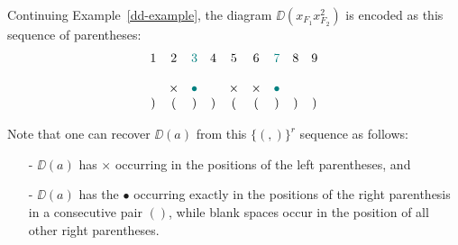 \begin{example} \label{dd-to-()-example}
  \rm  Continuing Example~\ref{dd-example}, the diagram $\DD(x_{F_1} x_{F_2}^2)$ is encoded as this sequence of parentheses:
    \[\begin{array}{ccccccccc}
     1 & 2 & {\color{teal} 3} & 4 & 5 & 6 & {\color{teal} 7} & 8 & 9  \\ \\
      & \times & {\color{teal} \bullet} &  & \times & \times & {\color{teal} \bullet} &  & \\
     ) & ( & ) & ) & ( & ( & ) & ) & )
\end{array}\]
\end{example}

\noindent
Note that one can recover $\DD(a)$ from this
 $\{(,)\}^r$ sequence as follows: 
 \begin{itemize}
  \item[-]  $\DD(a)$ has $\times$ occurring in the positions of the left parentheses, and 
     \item[-] $\DD(a)$ has the $\bullet$ occurring
 exactly in the positions of the right parenthesis in a consecutive pair $()$, while blank spaces occur in the position of all other right parentheses.
 \end{itemize}

